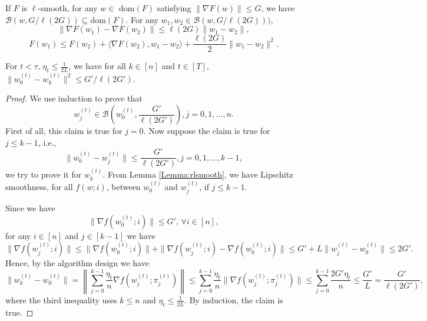\documentclass[10pt,a4paper]{amsart}
\begin{document}
\begin{Lemma}
    \label{Lemma:rlsmooth}
    If $F$ is $\ell$-smooth, for any $w\in$ $\mathrm{dom}(F)$ satisfying $\|\nabla F(w)\|\leq G$, we have $\mathcal{B}(w,G/\ell(2G))\subseteq$$\mathrm{dom}(F)$. For any $w_1, w_2\in \mathcal{B}(w,G/\ell(2G)))$, 
    $$\|\nabla F(w_1)-\nabla F(w_2)\|\leq \ell(2G)\|w_1-w_2\|,$$ 
    $$ F(w_1)\leq F(w_2)+\langle \nabla F(w_2), w_1-w_2\rangle +\frac{\ell(2G)}{2}\|w_1-w_2\|^2.$$
\end{Lemma}

\begin{Lemma}
\label{Lemma:epsilon}
For $t<\tau$, $\eta_t \leq \frac{1}{2L}$, we have for all $k\in[n]$ and $t\in[T]$, $\|w^{(t)}_0-w^{(t)}_k\|^2\leq G'/\ell(2G').$
\end{Lemma}

\begin{proof}
    We use induction to prove that 
\[
w_j^{(t)} \in \mathcal{B}(w_0^{(t)}, \frac{G'}{\ell(2G')}), j = 0, 1, \ldots, n.
\]
First of all, this claim is true for \( j = 0 \). Now suppose the claim is true for $j\leq k-1$, i.e., 
\[
\|w_0^{(t)} - w_j^{(t)}\| \leq \frac{G'}{\ell(2G')}, j = 0, 1, \ldots, k-1,
\]
we try to prove it for \( w_k^{(t)} \). From Lemma \ref{Lemma:rlsmooth}, we have Lipschitz smoothness, for all $f(w;i)$, between $w^{(t)}_0$ and $w^{(t)}_j$, if $j\leq k-1$.

Since we have  
\[
\|\nabla f(w_0^{(t)};i)\| \leq G', \, \forall i \in [n],
\]
for any \( i \in [n] \) and \( j \in [k-1] \) we have
\[
\|\nabla f(w_j^{(t)};i)\| \leq \|\nabla f(w_0^{(t)};i)\| + \|\nabla f(w_j^{(t)};i) - \nabla f(w_0^{(t)};i)\| \leq G' + L \|w_j^{(t)} - w_0^{(t)}\| \leq 2G'.
\]
Hence, by the algorithm design we have
\[
\|w_k^{(t)} - w_0^{(t)}\| = \left\|\sum_{j=0}^{k-1} \frac{\eta_t}{n} \nabla f(w_j^{(t)}; \pi_j^{(t)})\right\| \leq \sum_{j=0}^{k-1} \frac{\eta_t}{n} \|\nabla f(w_j^{(t)}; \pi_j^{(t)})\| \leq \sum_{j=0}^{k-1} \frac{2G' \eta_t}{n} \leq \frac{G'}{L} = \frac{G'}{\ell(2G')},
\]
where the third inequality uses \( k \leq n \) and \( \eta_t \leq \frac{1}{2L}.
\) By induction, the claim is true.
\end{proof}
\end{document}
